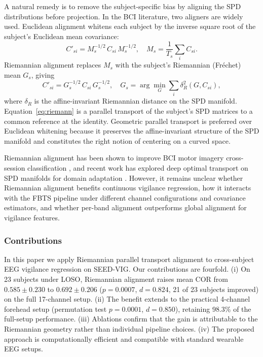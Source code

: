 \documentclass[journal,twoside,web]{ieeecolor2}
\begin{document}
A natural remedy is to remove the subject-specific bias by aligning
the SPD distributions before projection. In the BCI literature, two
aligners are widely used. Euclidean alignment
\cite{he2018euclidean} whitens each subject by the inverse square
root of the subject's Euclidean mean covariance:
\begin{equation}
C'_{si} = M_s^{-1/2}\, C_{si}\, M_s^{-1/2},
\quad M_s = \frac{1}{T_s}\sum_i C_{si}.
\label{eq:euclidean}
\end{equation}
Riemannian alignment
\cite{barachant2010lvaica, barachant2012tbme, zanini2018, Rodrigues2019, zhuo2024} replaces
$M_s$ with the subject's Riemannian (Fr\'echet) mean $G_s$, giving
\begin{equation}
C'_{si} = G_s^{-1/2}\, C_{si}\, G_s^{-1/2},
\quad G_s = \arg\min_{G}\sum_i \delta_R^2(G, C_{si}),
\label{eq:riemann}
\end{equation}
where $\delta_R$ is the affine-invariant Riemannian distance on the SPD
manifold. Equation~\eqref{eq:riemann} is a parallel transport of the
subject's SPD matrices to a common reference at the identity. Geometric
parallel transport \cite{yair2019ptspd} is preferred over Euclidean whitening because it
preserves the affine-invariant structure of the SPD manifold \cite{moakher2005,pennec2006,congedo2017review} and
constitutes the right notion of centering on a curved space.

Riemannian alignment has been shown to improve BCI motor imagery
cross-session classification \cite{zanini2018, Rodrigues2019}, and recent
work has explored deep optimal transport on SPD manifolds for domain
adaptation \cite{ju2025}. However, it remains unclear whether
Riemannian alignment benefits continuous vigilance regression, how it
interacts with the FBTS pipeline under different channel configurations
and covariance estimators, and whether per-band alignment outperforms
global alignment for vigilance features.

\subsubsection{Contributions} In this paper we apply Riemannian parallel
transport alignment to cross-subject EEG vigilance regression on
SEED-VIG. Our contributions are fourfold. (i) On 23 subjects under
LOSO, Riemannian alignment raises mean COR from $0.585 \pm 0.230$ to
$0.692 \pm 0.206$ ($p = 0.0007$, $d = 0.824$, 21 of 23 subjects
improved) on the full 17-channel setup. (ii) The benefit extends to
the practical 4-channel forehead setup (permutation test
$p = 0.0001$, $d = 0.850$), retaining 98.3\%
of the full-setup performance. (iii) Ablations confirm that
the gain is attributable to the Riemannian geometry rather than
individual pipeline choices. (iv) The proposed approach is computationally
efficient and compatible with standard wearable EEG setups.
\end{document}
